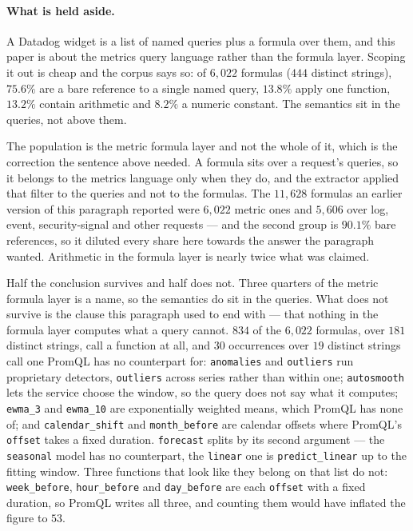 \paragraph{What is held aside.}
A Datadog widget is a list of named queries plus a formula over them, and this paper is
about the metrics query language rather than the formula layer. Scoping it out is cheap
and the corpus says so: of $6{,}022$ formulas ($444$ distinct strings), $75.6\%$ are a
bare reference to a single named query, $13.8\%$ apply one function, $13.2\%$ contain
arithmetic and $8.2\%$ a numeric constant. The semantics sit in the queries, not above
them.

The population is the metric formula layer and not the whole of it, which is the
correction the sentence above needed. A formula sits over a request's queries, so it
belongs to the metrics language only when they do, and the extractor applied that filter
to the queries and not to the formulas. The $11{,}628$ formulas an earlier version of
this paragraph reported were $6{,}022$ metric ones and $5{,}606$ over log, event,
security-signal and other requests --- and the second group is $90.1\%$ bare references,
so it diluted every share here towards the answer the paragraph wanted. Arithmetic in the
formula layer is nearly twice what was claimed.

Half the conclusion survives and half does not. Three quarters of the metric formula
layer is a name, so the semantics do sit in the queries. What does not survive is the
clause this paragraph used to end with --- that nothing in the formula layer computes
what a query cannot. $834$ of the $6{,}022$ formulas, over $181$ distinct strings, call
a function at all, and $30$ occurrences over $19$ distinct strings call one PromQL has no
counterpart for: \texttt{anomalies} and \texttt{outliers} run proprietary detectors,
\texttt{outliers} across series rather than within one; \texttt{autosmooth} lets the
service choose the window, so the query does not say what it computes;
\texttt{ewma\_3} and \texttt{ewma\_10} are exponentially weighted means, which PromQL
has none of; and \texttt{calendar\_shift} and \texttt{month\_before} are calendar
offsets where PromQL's \texttt{offset} takes a fixed duration. \texttt{forecast} splits
by its second argument --- the \texttt{seasonal} model has no counterpart, the
\texttt{linear} one is \texttt{predict\_linear} up to the fitting window. Three
functions that look like they belong on that list do not: \texttt{week\_before},
\texttt{hour\_before} and \texttt{day\_before} are each \texttt{offset} with a fixed
duration, so PromQL writes all three, and counting them would have inflated the figure
to $53$.

